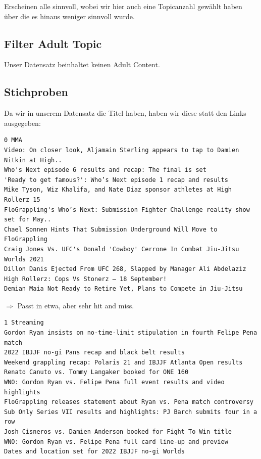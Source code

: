 \noindent Erscheinen alle sinnvoll, wobei wir hier auch eine Topicanzahl gewählt haben über die es hinaus weniger sinnvoll wurde.

\subsection{Filter Adult Topic}

Unser Datensatz beinhaltet keinen Adult Content.

\subsection{Stichproben}

Da wir in unserem Datensatz die Titel haben, haben wir diese statt den Links ausgegeben:

{\color{MidnightBlue}
\begin{lstlisting}
0 MMA
Video: On closer look, Aljamain Sterling appears to tap to Damien Nitkin at High..
Who's Next episode 6 results and recap: The final is set
'Ready to get famous?': Who’s Next episode 1 recap and results
Mike Tyson, Wiz Khalifa, and Nate Diaz sponsor athletes at High Rollerz 15
FloGrappling's Who’s Next: Submission Fighter Challenge reality show set for May..
Chael Sonnen Hints That Submission Underground Will Move to FloGrappling
Craig Jones Vs. UFC's Donald 'Cowboy' Cerrone In Combat Jiu-Jitsu Worlds 2021
Dillon Danis Ejected From UFC 268, Slapped by Manager Ali Abdelaziz
High Rollerz: Cops Vs Stonerz – 18 September!
Demian Maia Not Ready to Retire Yet, Plans to Compete in Jiu-Jitsu
\end{lstlisting}}

\noindent$\Rightarrow$ Passt in etwa, aber sehr hit and miss.

{\color{MidnightBlue}
\begin{lstlisting}
1 Streaming
Gordon Ryan insists on no-time-limit stipulation in fourth Felipe Pena match
2022 IBJJF no-gi Pans recap and black belt results
Weekend grappling recap: Polaris 21 and IBJJF Atlanta Open results
Renato Canuto vs. Tommy Langaker booked for ONE 160
WNO: Gordon Ryan vs. Felipe Pena full event results and video highlights
FloGrappling releases statement about Ryan vs. Pena match controversy
Sub Only Series VII results and highlights: PJ Barch submits four in a row
Josh Cisneros vs. Damien Anderson booked for Fight To Win title
WNO: Gordon Ryan vs. Felipe Pena full card line-up and preview
Dates and location set for 2022 IBJJF no-gi Worlds
\end{lstlisting}}

